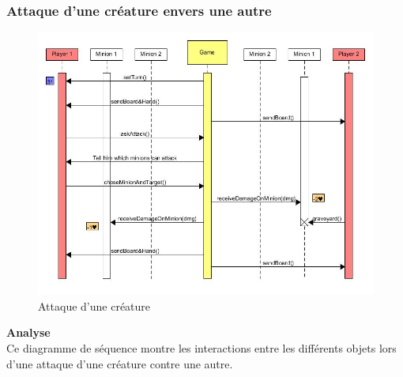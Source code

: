 \subsubsection{Attaque d'une créature envers une autre}
{
\begin{figure}[H]
    \includegraphics[width=1\textwidth,height=1\textwidth]{Images/AttackOnMinion.jpg}
    \caption{\label{Sequence Diagram Partie} Attaque d'une créature}
\end{figure}
\noindent\textbf{Analyse}\\
Ce diagramme de séquence montre les interactions entre les différents objets lors d'une attaque d'une créature contre une autre.
}

